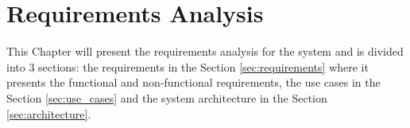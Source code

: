 \chapter{Requirements Analysis}
\label{ch:requirements_analysis}

This Chapter will present the requirements analysis for the system and is
divided into 3 sections: the requirements in the Section \ref{sec:requirements}
where it presents the functional and non-functional requirements, the use cases
in the Section \ref{sec:use_cases} and the system architecture in the Section
\ref{sec:architecture}.




